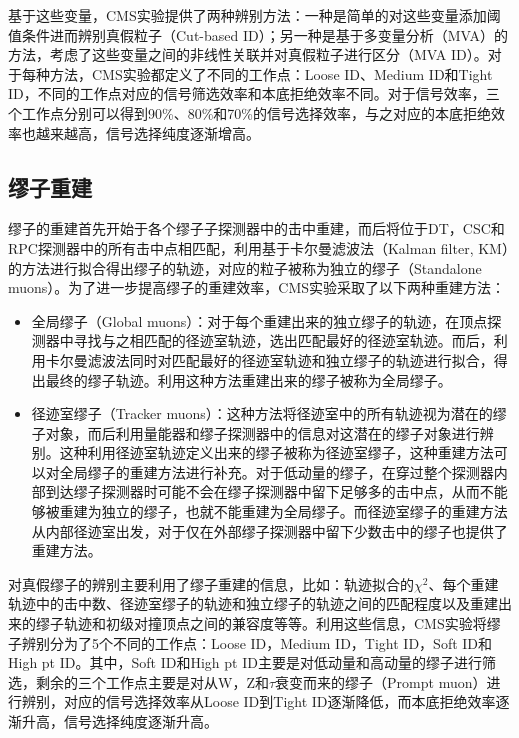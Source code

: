 基于这些变量，CMS实验提供了两种辨别方法：一种是简单的对这些变量添加阈值条件进而辨别真假粒子（Cut-based ID）；另一种是基于多变量分析（MVA）的方法，考虑了这些变量之间的非线性关联并对真假粒子进行区分（MVA ID）。对于每种方法，CMS实验都定义了不同的工作点：Loose ID、Medium ID和Tight ID，不同的工作点对应的信号筛选效率和本底拒绝效率不同。对于信号效率，三个工作点分别可以得到90\%、80\%和70\%的信号选择效率，与之对应的本底拒绝效率也越来越高，信号选择纯度逐渐增高。

\subsection{缪子重建}\label{subsec:MuonReco}

缪子的重建首先开始于各个缪子子探测器中的击中重建，而后将位于DT，CSC和RPC探测器中的所有击中点相匹配，利用基于卡尔曼滤波法（Kalman filter, KM）的方法进行拟合得出缪子的轨迹，对应的粒子被称为独立的缪子（Standalone muons）。为了进一步提高缪子的重建效率，CMS实验采取了以下两种重建方法：
\begin{itemize}
    \item 全局缪子（Global muons）：对于每个重建出来的独立缪子的轨迹，在顶点探测器中寻找与之相匹配的径迹室轨迹，选出匹配最好的径迹室轨迹。而后，利用卡尔曼滤波法同时对匹配最好的径迹室轨迹和独立缪子的轨迹进行拟合，得出最终的缪子轨迹。利用这种方法重建出来的缪子被称为全局缪子。
    \item 径迹室缪子（Tracker muons）：这种方法将径迹室中的所有轨迹视为潜在的缪子对象，而后利用量能器和缪子探测器中的信息对这潜在的缪子对象进行辨别。这种利用径迹室轨迹定义出来的缪子被称为径迹室缪子，这种重建方法可以对全局缪子的重建方法进行补充。对于低动量的缪子，在穿过整个探测器内部到达缪子探测器时可能不会在缪子探测器中留下足够多的击中点，从而不能够被重建为独立的缪子，也就不能重建为全局缪子。而径迹室缪子的重建方法从内部径迹室出发，对于仅在外部缪子探测器中留下少数击中的缪子也提供了重建方法。
\end{itemize}

对真假缪子的辨别主要利用了缪子重建的信息，比如：轨迹拟合的$\chi^{2}$、每个重建轨迹中的击中数、径迹室缪子的轨迹和独立缪子的轨迹之间的匹配程度以及重建出来的缪子轨迹和初级对撞顶点之间的兼容度等等。利用这些信息，CMS实验将缪子辨别分为了5个不同的工作点：Loose ID，Medium ID，Tight ID，Soft ID和High pt ID。其中，Soft ID和High pt ID主要是对低动量和高动量的缪子进行筛选，剩余的三个工作点主要是对从W，Z和$\tau$衰变而来的缪子（Prompt muon）进行辨别，对应的信号选择效率从Loose ID到Tight ID逐渐降低，而本底拒绝效率逐渐升高，信号选择纯度逐渐升高。
